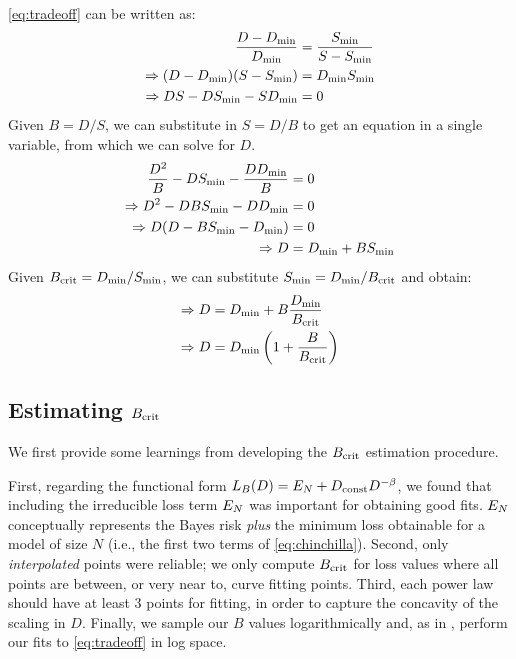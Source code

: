 
\cref{eq:tradeoff} can be written as:
\begin{align*}
  \frac{D - D_{\text{min}}}{D_{\text{min}}} &= \frac{S_{\text{min}}}{S - S_{\text{min}}} \\
  \Rightarrow (D - D_{\text{min}})(S - S_{\text{min}}) &= D_{\text{min}} S_{\text{min}} \\
  \Rightarrow D S - D S_{\text{min}} - S D_{\text{min}} &= 0
\end{align*}
Given $B = {D}/{S}$, we can substitute in
$S={D}/{B}$ to get an equation in a single variable, from
which we can solve for $D$.
\begin{align*}
  \frac{D^2}{B} - D S_{\text{min}} - \frac{D D_{\text{min}}}{B} &= 0 \\
  \Rightarrow D^2 - D B S_{\text{min}} - D D_{\text{min}} &= 0 \\
  \Rightarrow D (D - B S_{\text{min}} - D_{\text{min}}) &= 0 \\
  \Rightarrow D &= D_{\text{min}} + B S_{\text{min}}
\end{align*}
Given $B_{\text{crit}} = {D_{\text{min}}}/{S_{\text{min}}}$, we can substitute $S_{\text{min}} = {D_{\text{min}}}/{B_{\text{crit}}}$ and obtain:
\begin{align*}
  \Rightarrow D &= D_{\text{min}} + B \frac{D_{\text{min}}}{B_{\text{crit}}} \\
  \Rightarrow D &= D_{\text{min}} \left( 1 + \frac{B}{B_{\text{crit}}} \right)
\end{align*}

\subsection{Estimating $B_{\text{crit}}$}\label{sec:appendix_estimating_cbs}

We first provide some learnings from developing the $B_{\text{crit}}$ estimation
procedure.

First, regarding the functional form $L_{B}(D) = E_N + D_{\text{const}}
D^{-\beta}$, we found that including the irreducible loss term $E_N$
was important for obtaining good fits.  $E_N$ conceptually represents
the Bayes risk \emph{plus} the minimum loss obtainable for a model of
size $N$ (i.e., the first two terms of \cref{eq:chinchilla}).
%
Second, only \emph{interpolated} points were reliable; we only compute
$B_{\text{crit}}$ for loss values where all points are between, or very near to,
curve fitting points.
%
Third, each power law should have at least $3$ points for fitting, in
order to capture the concavity of the scaling in $D$.
%
Finally, we sample our $B$ values logarithmically and, as in
\citet{mccandlish2018empirical}, perform our fits to
\cref{eq:tradeoff} in log space.

